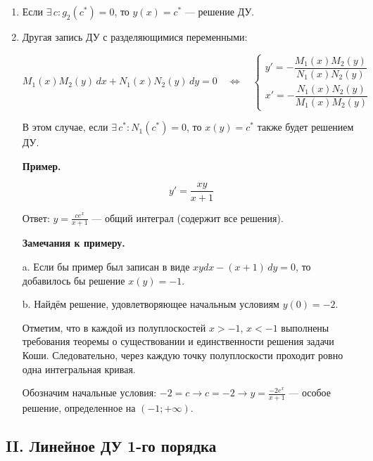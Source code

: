 {\begin{enumerate}
		
		Если $g_2(y)$ непрерывно дифференцируема, уравнение удовлетворяет теореме о существовании и единственности решения задачи Коши. Следовательно, через каждую точку $\Omega^*$ проходит ровно одна интегральная кривая. Также выполнены требования теоремы 2.1. Следовательно, равенство $G(x) - F(y) = \text{const}$ содержит все решения   ДУ   в области $\Omega^*$.

		\item Если $\exists\, c : g_2(c^*) = 0$, то $y(x) = c^*$ — решение ДУ.

		\item Другая запись ДУ с разделяющимися переменными:

		\[
		M_1(x)M_2(y) \, dx + N_1(x)N_2(y) \, dy = 0 \quad \Leftrightarrow \quad
		\begin{cases}
		y' = -\dfrac{M_1(x)M_2(y)}{N_1(x)N_2(y)} \\
		x' = -\dfrac{N_1(x)N_2(y)}{M_1(x)M_2(y)}
		\end{cases}
		\]
		
		
		
		В этом случае, если \( \exists \, c^* : N_1(c^*) = 0 \), то \( x(y) = c^* \) также будет решением ДУ.

		\textbf{Пример.}



	\[
	y' = \frac{xy}{x + 1}
	\]



	Ответ: $y = \frac{ce^x}{x + 1}$ — общий интеграл (содержит все решения).

	\textbf{Замечания к примеру.}

	a. Если бы пример был записан в виде $xydx - (x + 1) \, dy = 0$, то добавилось бы решение $x(y) = -1$.

	b. Найдём решение, удовлетворяющее начальным условиям $y(0) = -2$.

	Отметим, что в каждой из полуплоскостей $x > -1$, $x < -1$ выполнены требования теоремы о существовании и единственности решения задачи Коши. Следовательно, через каждую точку полуплоскости проходит ровно одна интегральная кривая.

	Обозначим начальные условия: $-2 = c \to c = -2 \to y = \frac{-2e^x}{x + 1}$ — особое решение, определенное на $(-1; + \infty)$.

		
	\end{enumerate}

	\newpage

	\subsection*{II. Линейное ДУ 1-го порядка}



}
